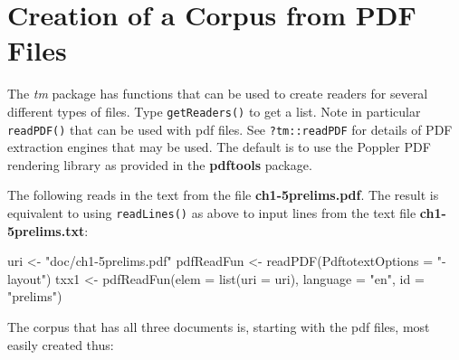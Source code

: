 \documentclass{tufte-book}\usepackage[]{graphicx}\usepackage[]{color}
\newcommand{\txtt}[1]{\texttt{#1}}
\begin{document}
\section{Creation of a Corpus from PDF Files}

The {\em tm} package has functions that can be used to create readers
for several different types of files.  Type \txtt{getReaders()} to get
a list.  Note in particular \txtt{readPDF()} that can be used with pdf
files.  See \txtt{?tm::readPDF} for details of PDF extraction
engines that may be used.  The default is to use the Poppler PDF
rendering library as provided in the {\bf pdftools} package.

The following reads in the text from the file {\bf ch1-5prelims.pdf}.
The result is equivalent to using \txtt{readLines()} as above to
input lines from the text file {\bf ch1-5prelims.txt}:
\begin{Schunk}
\begin{Sinput}
uri <- "doc/ch1-5prelims.pdf"
pdfReadFun <- readPDF(PdftotextOptions = "-layout")
txx1 <- pdfReadFun(elem = list(uri = uri),
                   language = "en", id = "prelims")
\end{Sinput}
\end{Schunk}

The corpus that has all three documents is, starting with the
pdf files, most easily created thus:
\begin{fullwidth}
\begin{Schunk}
\end{Schunk}
\end{fullwidth}
\end{document}
